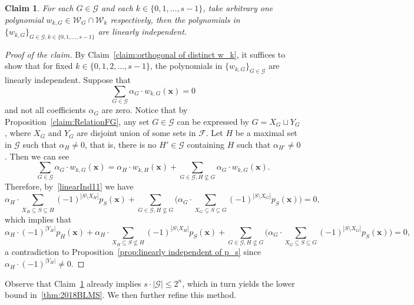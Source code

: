 \documentclass[11pt]{article}
\newtheorem{claim}[theorem]{Claim}
\theoremstyle{definition}
\newenvironment{poc}{\begin{proof}[Proof of the claim]\renewcommand*{\qedsymbol}{$\blacksquare$}}{\end{proof}}
\begin{document}
\begin{claim}\label{claim:SudakovsBound}
    For each \(G\in\mathcal{G}\) and each \(k\in\{0,1,\ldots,s-1\}\), take arbitrary one polynomial \(w_{k,G}\in\mathcal{W}_{G}\cap \mathcal{W}_{k}\) respectively, then the polynomials in \(\{w_{k,G}\}_{G\in\mathcal{G},k\in \{0,1,\ldots,s-1\}}\) are linearly independent.
\end{claim}
\begin{poc}
By Claim~\ref{claim:orthogonal of distinct w_k}, it suffices to show that for fixed \(k\in \{0,1,2,\ldots,s-1\}\), the polynomials in \(\{w_{k,G}\}_{G\in\mathcal{G}}\) are linearly independent. Suppose that 
\begin{equation}\label{linearInd11}
    \sum_{G\in \mathcal{G}}\alpha_{G}\cdot w_{k,G}(\bm{x})=0
\end{equation}
and not all coefficients \(\alpha_{G}\) are zero. Notice that by Proposition~\ref{claim:RelationFG}, any set \(G\in\mathcal{G}\) can be expressed by \(G=X_{G}\sqcup Y_{G}\), where \(X_{G}\) and \(Y_{G}\) are disjoint union of some sets in \(\mathcal{F}\). Let \(H\) be a maximal set in \(\mathcal{G}\) such that \(\alpha_{H}\neq 0\), that is, there is no \(H'\in\mathcal{G}\) containing \(H\) such that \(\alpha_{H'}\neq 0\). Then we can see
\[
\sum_{G\in \mathcal{G}}\alpha_{G}\cdot w_{k,G}(\bm{x})=\alpha_{H}\cdot w_{k,H}(\bm{x})+\sum_{G\in \mathcal{G},H\nsubseteq G}\alpha_{G}\cdot w_{k,G}(\bm{x}).
\]
Therefore, by~\eqref{linearInd11} we have
\[
\alpha_{H}\cdot \sum_{X_{H}\subseteq S\subseteq H}(-1)^{|S\setminus X_{H}|}p_S(\bm{x}) + \sum_{G\in \mathcal{G},H\nsubseteq G}\bigg(\alpha_{G}\cdot\sum\limits_{X_{G}\subseteq S\subseteq G}(-1)^{|S\setminus X_{G}|}p_{S}(\bm{x}) \bigg)=0,
\]
which implies that
\[
\alpha_{H}\cdot (-1)^{|Y_{H}|}p_{H}(\bm{x})+
\alpha_{H}\cdot \sum_{X_{H}\subseteq S\nsubseteq H}(-1)^{|S\setminus X_{H}|}p_S(\bm{x}) + \sum_{G\in \mathcal{G},H\nsubseteq G}\bigg(\alpha_{G}\cdot\sum\limits_{X_{G}\subseteq S\subseteq G}(-1)^{|S\setminus X_{G}|}p_{S}(\bm{x}) \bigg)=0,
\]
a contradiction to Proposition~\ref{prop:linearly independent of p_s} since \(\alpha_{H}\cdot (-1)^{|Y_{H}|}\neq 0\).
\end{poc}
Observe that Claim~\ref{claim:SudakovsBound} already implies \(s\cdot|\mathcal{G}|\le 2^{n}\), which in turn yields the lower bound in~\cref{thm:2018BLMS}. We then further refine this method.
\end{document}
